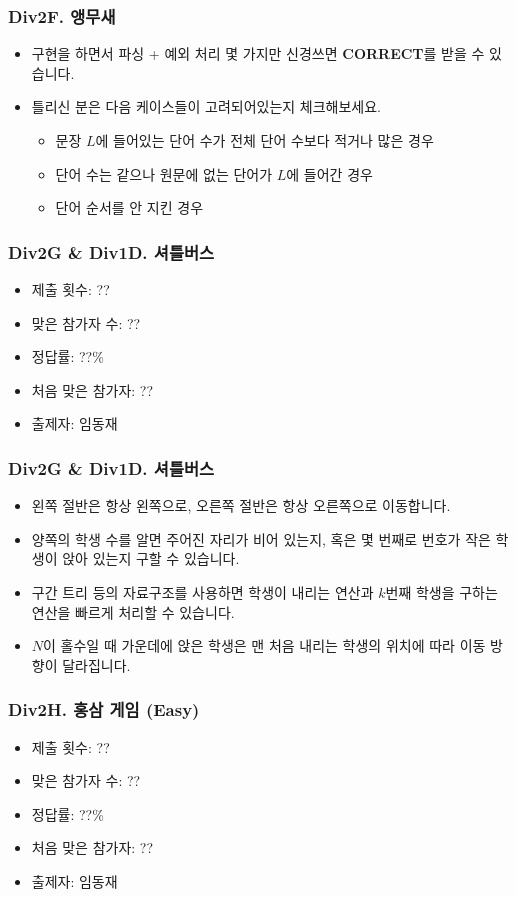 \documentclass[xetex]{beamer}
\begin{document}
\begin{frame}
  \frametitle{Div2F. 앵무새}
  \begin{itemize}
    \item 구현을 하면서 파싱 + 예외 처리 몇 가지만 신경쓰면 \textbf{CORRECT}를 받을 수 있습니다.
    \item 틀리신 분은 다음 케이스들이 고려되어있는지 체크해보세요.
    \begin{itemize}
      \item 문장 $L$에 들어있는 단어 수가 전체 단어 수보다 적거나 많은 경우
      \item 단어 수는 같으나 원문에 없는 단어가 $L$에 들어간 경우
      \item 단어 순서를 안 지킨 경우
    \end{itemize}
  \end{itemize}
\end{frame}

\begin{frame}
  \frametitle{Div2G \& Div1D. 셔틀버스}
  \begin{itemize}
    \item 제출 횟수: ??
    \item 맞은 참가자 수: ??
    \item 정답률: ??\%
    \item 처음 맞은 참가자: ??
    \item 출제자: 임동재
  \end{itemize}
\end{frame}

\begin{frame}
  \frametitle{Div2G \& Div1D. 셔틀버스}
  \begin{itemize}
    \item 왼쪽 절반은 항상 왼쪽으로, 오른쪽 절반은 항상 오른쪽으로 이동합니다.
    \item 양쪽의 학생 수를 알면 주어진 자리가 비어 있는지, 혹은 몇 번째로 번호가 작은 학생이 앉아 있는지 구할 수 있습니다.
    \item 구간 트리 등의 자료구조를 사용하면 학생이 내리는 연산과 $k$번째 학생을 구하는 연산을 빠르게 처리할 수 있습니다.
    \item $N$이 홀수일 때 가운데에 앉은 학생은 맨 처음 내리는 학생의 위치에 따라 이동 방향이 달라집니다.
  \end{itemize}
\end{frame}

\begin{frame}
  \frametitle{Div2H. 홍삼 게임 (Easy)}
  \begin{itemize}
    \item 제출 횟수: ??
    \item 맞은 참가자 수: ??
    \item 정답률: ??\%
    \item 처음 맞은 참가자: ??
    \item 출제자: 임동재
  \end{itemize}
\end{frame}
\end{document}
